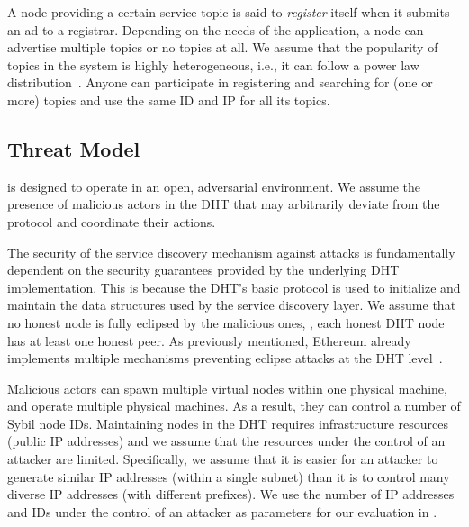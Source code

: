 A node providing a certain service topic is said to \emph{register} itself when it submits an ad to a registrar. %
Depending on the needs of the application, a node can advertise multiple topics or no topics at all. 
We assume that the popularity of topics in the system is highly heterogeneous, i.e., it can follow a power law distribution~\cite{kim2018measuring}.
Anyone can participate in registering and searching for (one or more) topics and use the same ID and IP for all its topics. 

\subsection{Threat Model}
\label{sec:threat}

\sysname is designed to operate in an open, adversarial environment.
We assume the presence of malicious actors in the DHT that may arbitrarily deviate from the protocol and coordinate their actions.


The security of the service discovery mechanism against attacks is fundamentally dependent on the security guarantees provided by the underlying DHT implementation.
This is because the DHT's basic protocol is used to initialize and maintain the data structures used by the service discovery layer.
We assume that no honest node is fully eclipsed by the malicious ones, \ie, each honest DHT node has at least one honest peer.
As previously mentioned, Ethereum already implements multiple mechanisms preventing eclipse attacks at the DHT level~\cite{marcus2018low, henningsen2019eclipsing}.  

Malicious actors can spawn multiple virtual nodes within one physical machine, and operate multiple physical machines.
As a result, they can control a number of Sybil node IDs.
Maintaining nodes in the DHT requires infrastructure resources (public IP addresses) and we assume that the resources under the control of an attacker are limited.
Specifically, we assume that it is easier for an attacker to generate similar IP addresses (\ie within a single subnet) than it is to control many diverse IP addresses (with different prefixes).
We use the number of IP addresses and IDs under the control of an attacker as parameters for our evaluation in .


